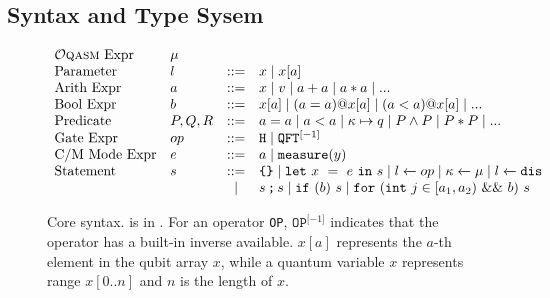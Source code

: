 \subsection {Syntax and Type Sysem}\label{sec:syntax-types}


\begin{figure}[t]
{
  \small
  \[\begin{array}{llcl} 
      \text{\oqasm Expr} & \mu\\
      \text{Parameter} & l & ::= & x \mid x[a] \\
      \text{Arith Expr} & a & ::= & x \mid v \mid a + a \mid a * a \mid ... \\
      \text{Bool Expr} & b & ::= & x[a] \mid (a = a) @ x[a] \mid (a < a) @ x[a] \mid ... \\
      \text{Predicate} & P,Q,R & ::= & a = a \mid a < a \mid \kappa \mapsto q \mid P \wedge P \mid P * P \mid ... \\
      \text{Gate Expr} & op & ::= & \texttt{H} \mid \iqft[\lbrack -1 \rbrack]{}{} \\
      \text{C/M Mode Expr}& e & ::= & a \mid \smea{y} \\
      \text{Statement} & s & ::= & \sskip \mid \sexp{x}{e}{s} \mid  \ssassign{l}{}{op} \mid \ssassign{\kappa}{}{\mu} 
                                 \mid \ssassign{l}{}{\sdis}
                                 \\ & & \mid & \sseq{s}{s} \mid \sifq{b}{s} \mid
                                     \sqwhile{j}{a_1}{a_2}{b}{s}
    \end{array}
  \]
}
\vspace*{-1em}
  \caption{Core \qafny syntax. \oqasm is in . For an operator \texttt{OP}, $\texttt{OP}^{\lbrack -1 \rbrack}$ indicates that the operator has a built-in inverse available. $x[a]$ represents the $a$-th element in the qubit array $x$, while a quantum variable $x$ represents range $x[0..n]$ and $n$ is the length of $x$. }
  \label{fig:vqimp}

\vspace*{-0.5em}
{
{\Small
  \begin{mathpar}



\end{mathpar}}}
\end{figure}
